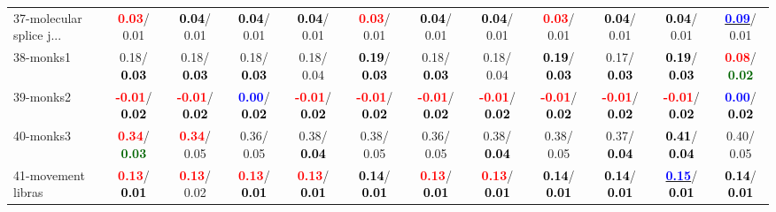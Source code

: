 \begin{table}[h]
\begin{center}
{\begin{tabular}{lc|c|c|c|c|c|c|c|c|c|c}
37-molecular splice j... & \textcolor{red}{\textbf{  0.03}}/  0.01 & \textcolor{black}{\textbf{  0.04}}/  0.01 & \textcolor{black}{\textbf{  0.04}}/  0.01 & \textcolor{black}{\textbf{  0.04}}/  0.01 & \textcolor{red}{\textbf{  0.03}}/  0.01 & \textcolor{black}{\textbf{  0.04}}/  0.01 & \textcolor{black}{\textbf{  0.04}}/  0.01 & \textcolor{red}{\textbf{  0.03}}/  0.01 & \textcolor{black}{\textbf{  0.04}}/  0.01 & \textcolor{black}{\textbf{  0.04}}/  0.01 & \underline{\textcolor{blue}{\textbf{  0.09}}}/  0.01 \\
38-monks1 &   0.18/\textcolor{black}{\textbf{  0.03}} &   0.18/\textcolor{black}{\textbf{  0.03}} &   0.18/\textcolor{black}{\textbf{  0.03}} &   0.18/  0.04 & \textcolor{black}{\textbf{  0.19}}/\textcolor{black}{\textbf{  0.03}} &   0.18/\textcolor{black}{\textbf{  0.03}} &   0.18/  0.04 & \textcolor{black}{\textbf{  0.19}}/\textcolor{black}{\textbf{  0.03}} &   0.17/\textcolor{black}{\textbf{  0.03}} & \textcolor{black}{\textbf{  0.19}}/\textcolor{black}{\textbf{  0.03}} & \textcolor{red}{\textbf{  0.08}}/\textcolor{darkgreen}{\textbf{  0.02}} \\
39-monks2 & \textcolor{red}{\textbf{ -0.01}}/\textcolor{black}{\textbf{  0.02}} & \textcolor{red}{\textbf{ -0.01}}/\textcolor{black}{\textbf{  0.02}} & \textcolor{blue}{\textbf{  0.00}}/\textcolor{black}{\textbf{  0.02}} & \textcolor{red}{\textbf{ -0.01}}/\textcolor{black}{\textbf{  0.02}} & \textcolor{red}{\textbf{ -0.01}}/\textcolor{black}{\textbf{  0.02}} & \textcolor{red}{\textbf{ -0.01}}/\textcolor{black}{\textbf{  0.02}} & \textcolor{red}{\textbf{ -0.01}}/\textcolor{black}{\textbf{  0.02}} & \textcolor{red}{\textbf{ -0.01}}/\textcolor{black}{\textbf{  0.02}} & \textcolor{red}{\textbf{ -0.01}}/\textcolor{black}{\textbf{  0.02}} & \textcolor{red}{\textbf{ -0.01}}/\textcolor{black}{\textbf{  0.02}} & \textcolor{blue}{\textbf{  0.00}}/\textcolor{black}{\textbf{  0.02}} \\ \hline
40-monks3 & \textcolor{red}{\textbf{  0.34}}/\textcolor{darkgreen}{\textbf{  0.03}} & \textcolor{red}{\textbf{  0.34}}/  0.05 &   0.36/  0.05 &   0.38/\textcolor{black}{\textbf{  0.04}} &   0.38/  0.05 &   0.36/  0.05 &   0.38/\textcolor{black}{\textbf{  0.04}} &   0.38/  0.05 &   0.37/\textcolor{black}{\textbf{  0.04}} & \textcolor{black}{\textbf{  0.41}}/\textcolor{black}{\textbf{  0.04}} &   0.40/  0.05 \\
41-movement libras & \textcolor{red}{\textbf{  0.13}}/\textcolor{black}{\textbf{  0.01}} & \textcolor{red}{\textbf{  0.13}}/  0.02 & \textcolor{red}{\textbf{  0.13}}/\textcolor{black}{\textbf{  0.01}} & \textcolor{red}{\textbf{  0.13}}/\textcolor{black}{\textbf{  0.01}} & \textcolor{black}{\textbf{  0.14}}/\textcolor{black}{\textbf{  0.01}} & \textcolor{red}{\textbf{  0.13}}/\textcolor{black}{\textbf{  0.01}} & \textcolor{red}{\textbf{  0.13}}/\textcolor{black}{\textbf{  0.01}} & \textcolor{black}{\textbf{  0.14}}/\textcolor{black}{\textbf{  0.01}} & \textcolor{black}{\textbf{  0.14}}/\textcolor{black}{\textbf{  0.01}} & \underline{\textcolor{blue}{\textbf{  0.15}}}/\textcolor{black}{\textbf{  0.01}} & \textcolor{black}{\textbf{  0.14}}/\textcolor{black}{\textbf{  0.01}} \\

\end{tabular}}
\end{center}
\end{table}
